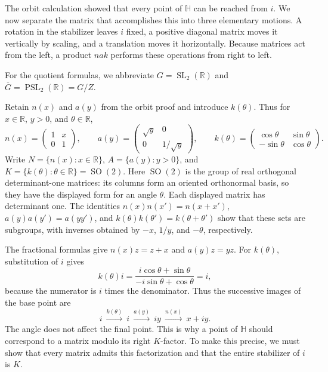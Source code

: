 The orbit calculation showed that every point of $\mathbb H$ can be reached from $i$. We now separate the matrix that accomplishes this into three elementary motions. A rotation in the stabilizer leaves $i$ fixed, a positive diagonal matrix moves it vertically by scaling, and a translation moves it horizontally. Because matrices act from the left, a product $nak$ performs these operations from right to left.

\label{hyperbolic.group-abbreviations}
For the quotient formulas, we abbreviate $G=\operatorname{SL}_2(\mathbb R)$ and $\overline G=\operatorname{PSL}_2(\mathbb R)=G/Z$.

\begin{definition}\label{hyperbolic.iwasawa-coordinates}
Retain $n(x)$ and $a(y)$ from the orbit proof and introduce $k(\theta)$. Thus for $x\in\mathbb R$, $y>0$, and $\theta\in\mathbb R$,
\[
 n(x)=\begin{pmatrix}1&x\\0&1\end{pmatrix},\qquad
 a(y)=\begin{pmatrix}\sqrt y&0\\0&1/\sqrt y\end{pmatrix},\qquad
 k(\theta)=\begin{pmatrix}\cos\theta&\sin\theta\\-\sin\theta&\cos\theta\end{pmatrix}.
\]
Write $N=\{n(x):x\in\mathbb R\}$, $A=\{a(y):y>0\}$, and $K=\{k(\theta):\theta\in\mathbb R\}=\operatorname{SO}(2)$. Here $\operatorname{SO}(2)$ is the group of real orthogonal determinant-one matrices: its columns form an oriented orthonormal basis, so they have the displayed form for an angle $\theta$. Each displayed matrix has determinant one. The identities $n(x)n(x')=n(x+x')$, $a(y)a(y')=a(yy')$, and $k(\theta)k(\theta')=k(\theta+\theta')$ show that these sets are subgroups, with inverses obtained by $-x$, $1/y$, and $-\theta$, respectively.
\end{definition}

The fractional formulas give $n(x)z=z+x$ and $a(y)z=yz$. For $k(\theta)$, substitution of $i$ gives
\[
 k(\theta)i=\frac{i\cos\theta+\sin\theta}{-i\sin\theta+\cos\theta}=i,
\]
because the numerator is $i$ times the denominator. Thus the successive images of the base point are
\[
 i\ \xrightarrow{k(\theta)}\ i\ \xrightarrow{a(y)}\ iy\ \xrightarrow{n(x)}\ x+iy.
\]
The angle does not affect the final point. This is why a point of $\mathbb H$ should correspond to a matrix modulo its right $K$-factor. To make this precise, we must show that every matrix admits this factorization and that the entire stabilizer of $i$ is $K$.

